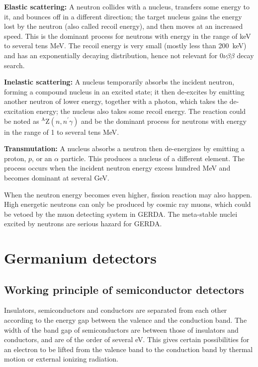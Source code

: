\textbf{Elastic scattering:} A neutron collides with a nucleus, transfers some energy to it, and bounces off in a different direction; the target nucleus gains the energy lost by the neutron (also called recoil energy), and then moves at an increased speed. This is the dominant process for neutrons with energy in the range of keV to several tens MeV. The recoil energy is very small (mostly less than 200~keV) and has an exponentially decaying distribution, hence not relevant for $0\nu\beta\beta$ decay search.

\textbf{Inelastic scattering:} A nucleus temporarily absorbs the incident neutron, forming a compound nucleus in an excited state; it then de-excites by emitting another neutron of lower energy, together with a photon, which takes the de-excitation energy; the nucleus also takes some recoil energy. The reaction could be noted as $^{\text{A}}$Z$(n,n^{\prime}\gamma)$ and be the dominant process for neutrons with energy in the range of 1 to several tens MeV.

\textbf{Transmutation:} A nucleus absorbs a neutron then de-energizes by emitting a proton, $p$, or an $\alpha$ particle. This produces a nucleus of a different element. The process occurs when the incident neutron energy excess hundred MeV and becomes dominant at several GeV.

When the neutron energy becomes even higher, fission reaction may also happen. High energetic neutrons can only be produced by cosmic ray muons, which could be vetoed by the muon detecting system in GERDA. The meta-stable nuclei excited by neutrons are serious hazard for GERDA.


\section{Germanium detectors}
\label{sec:det:semi}
\subsection{Working principle of semiconductor detectors}
\label{sec:det:prin}
Insulators, semiconductors and conductors are separated from each other according to the energy gap between the valence and the conduction band. The width of the band gap of semiconductors are between those of insulators and conductors, and are of the order of several eV. This gives certain possibilities for an electron to be lifted from the valence band to the conduction band by thermal motion or external ionizing radiation.

